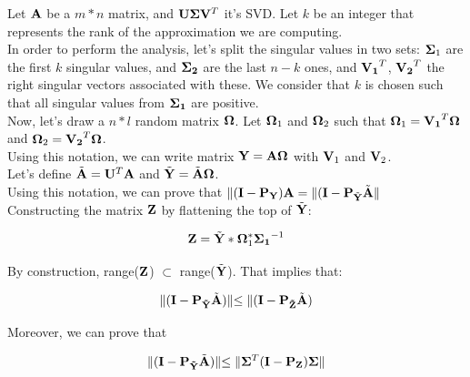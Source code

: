 \documentclass[onecolumn,12pt]{article}
\begin{document}
Let $\bold{A}$ be a $m*n$ matrix, and $\bold{U}\bold{\Sigma}\bold{V}^T$ it's
SVD. Let $k$ be an integer that represents the rank of the approximation we
are computing. \\

In order to perform the analysis, let's split the singular values in two sets:
$\bold{\Sigma}_1$ are the first $k$ singular values, and $\bold{\Sigma_2}$ are
the last $n - k$ ones, and $\bold{V_1}^T$, $\bold{V_2}^T$ the right singular
vectors associated with these. We consider that $k$ is chosen such that all
singular values from $\bold{\Sigma_1}$ are positive. \\

Now, let's draw a $n*l$ random matrix $\bold{\Omega}$. Let $\bold{\Omega}_1$
and $\bold{\Omega}_2$ such that $\bold{\Omega}_1 = \bold{V_1}^T \bold{\Omega}$
and $\bold{\Omega}_2 = \bold{V_2}^T \bold{\Omega}$. \\

Using this notation, we can write matrix $\bold{Y} = \bold{A\Omega}$ with
$\bold{V}_1$ and $\bold{V}_2$. \\

Let's define $\tilde{\bold{A}} = \bold{U}^T \bold{A}$ and $\tilde{\bold{Y}} =
\tilde{\bold{A}} \bold{\Omega}$. \\

Using this notation, we can prove that $\lVert (\bold{I} - \bold{P_Y}
)\bold{A} = \lVert (\bold{I} - \bold{P}_{\tilde{\bold{Y}}}
\tilde{\bold{A}}\lVert$ \\

Constructing the matrix $\bold{Z}$ by flattening the top of
$\tilde{\bold{Y}}$: 

\begin{equation}
\bold{Z} = \tilde{\bold{Y}} * \bold{\Omega}_1^* \bold{\Sigma_1}^{-1}
\end{equation}

By construction, range($\bold{Z}$) $\subset$ range($\tilde{\bold{Y}}$). That
implies that: 

\begin{equation}
\lVert (\bold{I} - \bold{P_{\tilde{Y}}} \tilde{\bold{A}}) \lVert \leq
\lVert (\bold{I} - \bold{P_{\tilde{Z}}} \tilde{\bold{A}})
\end{equation}

Moreover, we can prove that 

\begin{equation}
\lVert (\bold{I} - \bold{P_{\tilde{Y}}} \tilde{\bold{A}}) \lVert \leq
\lVert \bold{\Sigma}^T (\bold{I} - \bold{P_Z}) \bold{\Sigma}\lVert
\end{equation}
\end{document}
